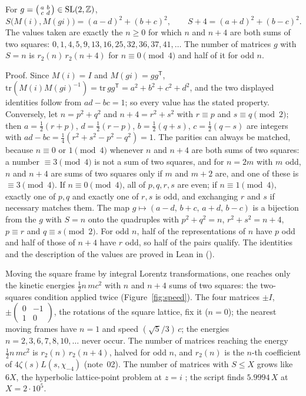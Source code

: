 \documentclass[11pt]{article}
\begin{document}
\begin{derivation}\label{d:square}
For $g = \left(\begin{smallmatrix}a&b\\c&d\end{smallmatrix}\right)\in\mathrm{SL}(2,\mathbb{Z})$,
\[
  S\bigl(M(i),M(gi)\bigr) = (a-d)^2+(b+c)^2,\qquad S+4 = (a+d)^2+(b-c)^2 .
\]
The values taken are exactly the $n\ge0$ for which $n$ and $n+4$ are both sums of two squares: $0, 1, 4, 5, 9, 13, 16, 25, 32, 36, 37, 41,\dots$
The number of matrices $g$ with $S = n$ is $r_2(n)\,r_2(n+4)$ for $n\equiv0\pmod 4$ and half of it for odd $n$.
\end{derivation}

\noindent
Proof.
Since $M(i) = I$ and $M(gi) = gg^{\mathsf T}$, $\mathrm{tr}(M(i)M(gi)^{-1}) = \mathrm{tr}\,gg^{\mathsf T} = a^2+b^2+c^2+d^2$, and the two displayed identities follow from $ad-bc = 1$; so every value has the stated property.
Conversely, let $n = p^2+q^2$ and $n+4 = r^2+s^2$ with $r\equiv p$ and $s\equiv q\pmod 2$; then $a = \tfrac12(r+p)$, $d = \tfrac12(r-p)$, $b = \tfrac12(q+s)$, $c = \tfrac12(q-s)$ are integers with $ad-bc = \tfrac14(r^2+s^2-p^2-q^2) = 1$.
The parities can always be matched, because $n\equiv0$ or $1\pmod4$ whenever $n$ and $n+4$ are both sums of two squares: a number $\equiv3\pmod4$ is not a sum of two squares, and for $n = 2m$ with $m$ odd, $n$ and $n+4$ are sums of two squares only if $m$ and $m+2$ are, and one of these is $\equiv3\pmod4$.
If $n\equiv0\pmod4$, all of $p,q,r,s$ are even; if $n\equiv1\pmod4$, exactly one of $p,q$ and exactly one of $r,s$ is odd, and exchanging $r$ and $s$ if necessary matches them.
The map $g\mapsto(a-d,\,b+c,\,a+d,\,b-c)$ is a bijection from the $g$ with $S = n$ onto the quadruples with $p^2+q^2 = n$, $r^2+s^2 = n+4$, $p\equiv r$ and $q\equiv s\pmod 2$.
For odd $n$, half of the representations of $n$ have $p$ odd and half of those of $n+4$ have $r$ odd, so half of the pairs qualify.
The identities and the description of the values are proved in Lean in \formal{} ().

\physical
Moving the square frame by integral Lorentz transformations, one reaches only the kinetic energies $\tfrac12 n\,mc^2$ with $n$ and $n+4$ sums of two squares: the two-squares condition applied twice (Figure~\ref{fig:speed}).
The four matrices $\pm I$, $\pm\left(\begin{smallmatrix}0&-1\\1&0\end{smallmatrix}\right)$, the rotations of the square lattice, fix it ($n = 0$); the nearest moving frames have $n = 1$ and speed $(\sqrt5/3)\,c$; the energies $n = 2, 3, 6, 7, 8, 10,\dots$ never occur.
The number of matrices reaching the energy $\tfrac12n\,mc^2$ is $r_2(n)\,r_2(n+4)$, halved for odd $n$, and $r_2(n)$ is the $n$-th coefficient of $4\zeta(s)L(s,\chi_{-4})$ (note~02).
The number of matrices with $S\le X$ grows like $6X$, the hyperbolic lattice-point problem at $z = i$ \cite{Iwaniec}; the script finds $5.9994\,X$ at $X = 2\cdot10^5$.
\end{document}
